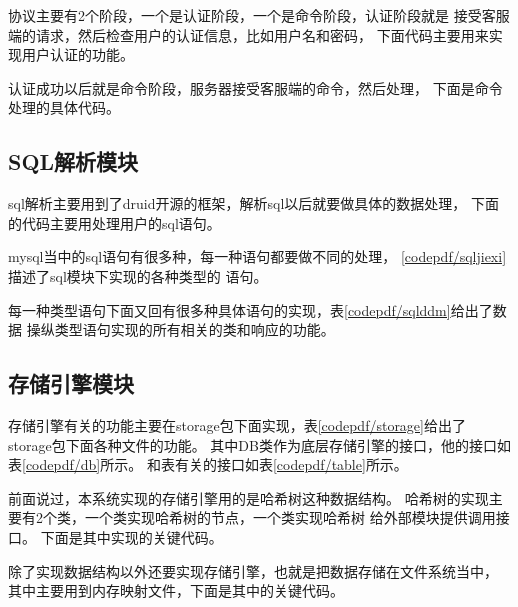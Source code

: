 

协议主要有2个阶段，一个是认证阶段，一个是命令阶段，认证阶段就是
接受客服端的请求，然后检查用户的认证信息，比如用户名和密码，
下面代码主要用来实现用户认证的功能。



认证成功以后就是命令阶段，服务器接受客服端的命令，然后处理，
下面是命令处理的具体代码。


\subsection{SQL解析模块}
sql解析主要用到了druid开源的框架，解析sql以后就要做具体的数据处理，
下面的代码主要用处理用户的sql语句。





mysql当中的sql语句有很多种，每一种语句都要做不同的处理，
\ref{codepdf/sqljiexi}描述了sql模块下实现的各种类型的
语句。

每一种类型语句下面又回有很多种具体语句的实现，表\ref{codepdf/sqlddm}给出了数据
操纵类型语句实现的所有相关的类和响应的功能。
\subsection{存储引擎模块}
存储引擎有关的功能主要在storage包下面实现，表\ref{codepdf/storage}给出了
storage包下面各种文件的功能。
其中DB类作为底层存储引擎的接口，他的接口如表\ref{codepdf/db}所示。
和表有关的接口如表\ref{codepdf/table}所示。

前面说过，本系统实现的存储引擎用的是哈希树这种数据结构。
哈希树的实现主要有2个类，一个类实现哈希树的节点，一个类实现哈希树
给外部模块提供调用接口。
下面是其中实现的关键代码。





除了实现数据结构以外还要实现存储引擎，也就是把数据存储在文件系统当中，
其中主要用到内存映射文件，下面是其中的关键代码。

